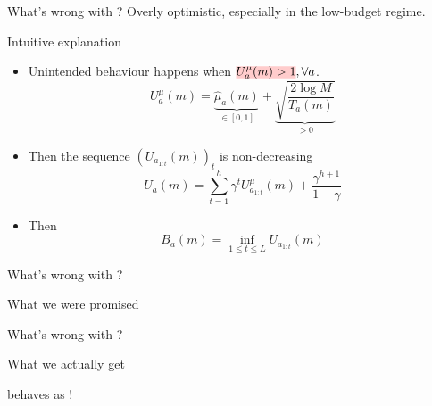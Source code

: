 \documentclass{beamer}
\begin{document}
\begin{frame}{What's wrong with \OLOP?}
    Overly optimistic, especially in the low-budget regime.

    \begin{alertblock}{Intuitive explanation}
    \begin{itemize}
        \item Unintended behaviour happens when $\hler{U^{\mu}_a(m) > 1}, \forall a$.
        \begin{equation*}
             U^{\mu}_a(m) = \underbrace{\hat{\mu}_a(m)}_{\in [0,1]} + \underbrace{\sqrt{\frac{2 \log M}{T_a(m)}}}_{> 0}
        \end{equation*}
        \pause
        \item Then the sequence $(U_{a_{1:t}}(m))_t$ is non-decreasing
        \begin{equation*}
        U_a(m) = \sum_{t=1}^h \gamma^t U^{\mu}_{a_{1:t}}(m) + \frac{\gamma^{h+1}}{1-\gamma}
        \end{equation*}
        \pause
        \item Then 
        \begin{equation*}
        B_a(m) = \inf_{1 \leq t \leq L} U_{a_{1:t}}(m)
        \end{equation*}
    \end{itemize}
    \end{alertblock}
    
\end{frame}

\begin{frame}{What's wrong with \OLOP?}
\begin{block}{What we were promised}
\begin{center}

\end{center}
\end{block}
\end{frame}

\begin{frame}{What's wrong with \OLOP?}
\begin{alertblock}{What we actually get}
\begin{center}

\end{center}
\end{alertblock}
\begin{flushright}
\OLOP behaves as !
\end{flushright}
\end{frame}
\end{document}
